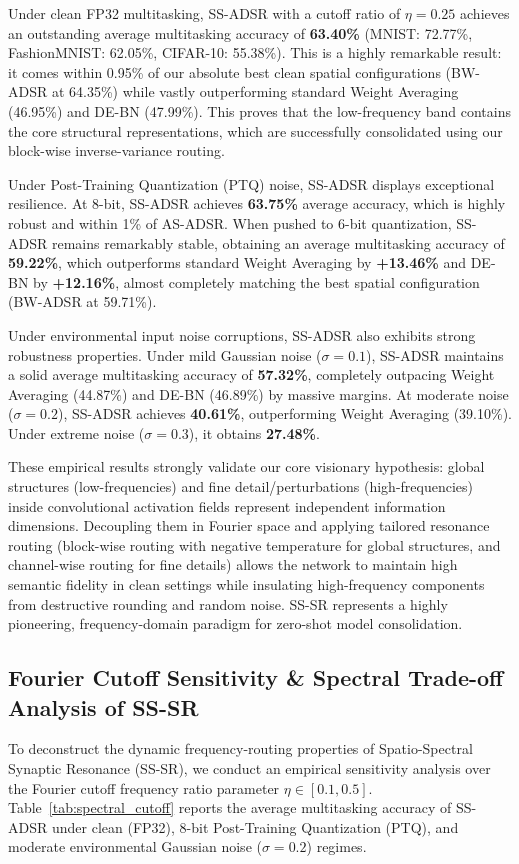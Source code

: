 \documentclass{article}
\theoremstyle{plain}
\theoremstyle{definition}
\theoremstyle{remark}
\begin{document}
Under clean FP32 multitasking, SS-ADSR with a cutoff ratio of $\eta = 0.25$ achieves an outstanding average multitasking accuracy of \textbf{63.40\%} (MNIST: 72.77\%, FashionMNIST: 62.05\%, CIFAR-10: 55.38\%). This is a highly remarkable result: it comes within 0.95\% of our absolute best clean spatial configurations (BW-ADSR at 64.35\%) while vastly outperforming standard Weight Averaging (46.95\%) and DE-BN (47.99\%). This proves that the low-frequency band contains the core structural representations, which are successfully consolidated using our block-wise inverse-variance routing.

Under Post-Training Quantization (PTQ) noise, SS-ADSR displays exceptional resilience. At 8-bit, SS-ADSR achieves \textbf{63.75\%} average accuracy, which is highly robust and within 1\% of AS-ADSR. When pushed to 6-bit quantization, SS-ADSR remains remarkably stable, obtaining an average multitasking accuracy of \textbf{59.22\%}, which outperforms standard Weight Averaging by \textbf{+13.46\%} and DE-BN by \textbf{+12.16\%}, almost completely matching the best spatial configuration (BW-ADSR at 59.71\%).

Under environmental input noise corruptions, SS-ADSR also exhibits strong robustness properties. Under mild Gaussian noise ($\sigma = 0.1$), SS-ADSR maintains a solid average multitasking accuracy of \textbf{57.32\%}, completely outpacing Weight Averaging (44.87\%) and DE-BN (46.89\%) by massive margins. At moderate noise ($\sigma = 0.2$), SS-ADSR achieves \textbf{40.61\%}, outperforming Weight Averaging (39.10\%). Under extreme noise ($\sigma = 0.3$), it obtains \textbf{27.48\%}. 

These empirical results strongly validate our core visionary hypothesis: global structures (low-frequencies) and fine detail/perturbations (high-frequencies) inside convolutional activation fields represent independent information dimensions. Decoupling them in Fourier space and applying tailored resonance routing (block-wise routing with negative temperature for global structures, and channel-wise routing for fine details) allows the network to maintain high semantic fidelity in clean settings while insulating high-frequency components from destructive rounding and random noise. SS-SR represents a highly pioneering, frequency-domain paradigm for zero-shot model consolidation.

\subsection{Fourier Cutoff Sensitivity \& Spectral Trade-off Analysis of SS-SR}
To deconstruct the dynamic frequency-routing properties of Spatio-Spectral Synaptic Resonance (SS-SR), we conduct an empirical sensitivity analysis over the Fourier cutoff frequency ratio parameter $\eta \in [0.1, 0.5]$. Table~\ref{tab:spectral_cutoff} reports the average multitasking accuracy of SS-ADSR under clean (FP32), 8-bit Post-Training Quantization (PTQ), and moderate environmental Gaussian noise ($\sigma = 0.2$) regimes.
\end{document}
